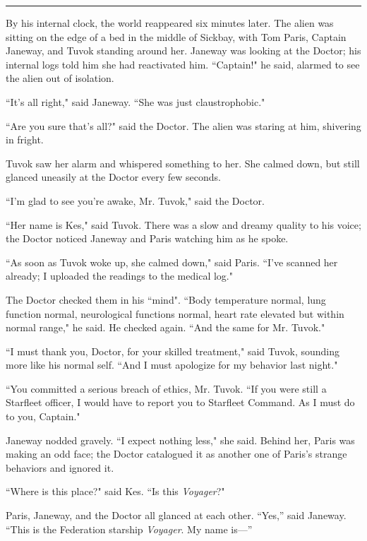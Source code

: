 \documentclass[twoside,letterpaper,12pt]{memoir}
\begin{document}
\begin{center}\rule{3cm}{0.4 pt}\end{center} 

By his internal clock, the world reappeared six minutes later. The alien was sitting on the edge of a bed in the middle of Sickbay, with Tom Paris, Captain Janeway, and Tuvok standing around her. Janeway was looking at the Doctor; his internal logs told him she had reactivated him. ``Captain!" he said, alarmed to see the alien out of isolation. 

``It's all right," said Janeway. ``She was just claustrophobic." 

``Are you sure that's all?" said the Doctor. The alien was staring at him, shivering in fright. 

Tuvok saw her alarm and whispered something to her. She calmed down, but still glanced uneasily at the Doctor every few seconds. 

``I'm glad to see you're awake, Mr. Tuvok," said the Doctor. 

``Her name is Kes," said Tuvok. There was a slow and dreamy quality to his voice; the Doctor noticed Janeway and Paris watching him as he spoke. 

``As soon as Tuvok woke up, she calmed down," said Paris. ``I've scanned her already; I uploaded the readings to the medical log." 

The Doctor checked them in his ``mind". ``Body temperature normal, lung function normal, neurological functions normal, heart rate elevated but within normal range," he said. He checked again. ``And the same for Mr. Tuvok." 

``I must thank you, Doctor, for your skilled treatment," said Tuvok, sounding more like his normal self. ``And I must apologize for my behavior last night." 

``You committed a serious breach of ethics, Mr. Tuvok. ``If you were still a Starfleet officer, I would have to report you to Starfleet Command. As I must do to you, Captain." 

Janeway nodded gravely. ``I expect nothing less," she said. Behind her, Paris was making an odd face; the Doctor catalogued it as another one of Paris's strange behaviors and ignored it. 

``Where is this place?" said Kes. ``Is this \textit{Voyager}?" 

Paris, Janeway, and the Doctor all glanced at each other. ``Yes,” said Janeway. ``This is the Federation starship \textit{Voyager}. My name is---” 
\end{document}
